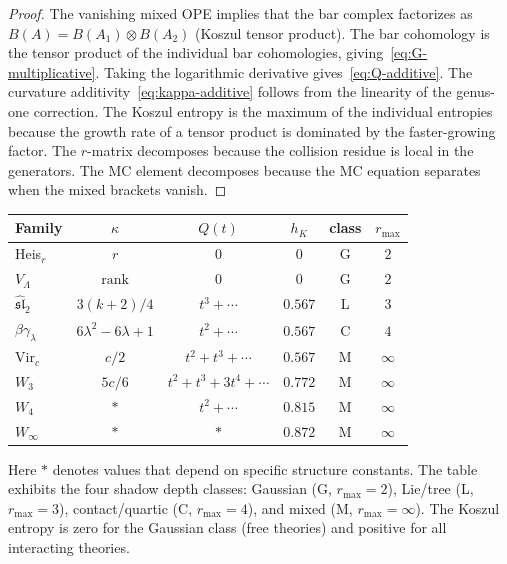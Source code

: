 \begin{proof}
The vanishing mixed OPE implies that the bar complex factorizes as
$B(A) = B(A_1) \otimes B(A_2)$ (Koszul tensor product). The bar
cohomology is the tensor product of the individual bar cohomologies,
giving~\eqref{eq:G-multiplicative}. Taking the logarithmic derivative
gives~\eqref{eq:Q-additive}. The curvature additivity~\eqref{eq:kappa-additive}
follows from the linearity of the genus-one correction. The Koszul entropy
is the maximum of the individual entropies because the growth rate of a
tensor product is dominated by the faster-growing factor. The $r$-matrix
decomposes because the collision residue is local in the generators.
The MC element decomposes because the MC equation separates when the
mixed brackets vanish.
\end{proof}

\begin{computation}

\smallskip
\begin{center}
\begin{tabular}{l c c c c c}
Family & $\kappa$ & $Q(t)$ & $h_K$ & class & $r_{\max}$ \\
\hline
Heis$_r$ & $r$ & $0$ & $0$ & G & $2$ \\
$V_\Lambda$ & $\mathrm{rank}$ & $0$ & $0$ & G & $2$ \\
$\widehat{\mathfrak{sl}}_2$ & $3(k+2)/4$ & $t^3+\cdots$ & $0.567$ & L & $3$ \\
$\beta\gamma_\lambda$ & $6\lambda^2{-}6\lambda{+}1$ & $t^2+\cdots$ & $0.567$ & C & $4$ \\
Vir$_c$ & $c/2$ & $t^2+t^3+\cdots$ & $0.567$ & M & $\infty$ \\
$W_3$ & $5c/6$ & $t^2+t^3+3t^4+\cdots$ & $0.772$ & M & $\infty$ \\
$W_4$ & $*$ & $t^2+\cdots$ & $0.815$ & M & $\infty$ \\
$W_\infty$ & $*$ & $*$ & $0.872$ & M & $\infty$
\end{tabular}
\end{center}

\smallskip
\noindent
Here $*$ denotes values that depend on specific structure constants.
The table exhibits the four shadow depth classes: Gaussian (G, $r_{\max}=2$),
Lie/tree (L, $r_{\max}=3$), contact/quartic (C, $r_{\max}=4$), and
mixed (M, $r_{\max}=\infty$). The Koszul entropy is zero for the
Gaussian class (free theories) and positive for all interacting theories.
\end{computation}

